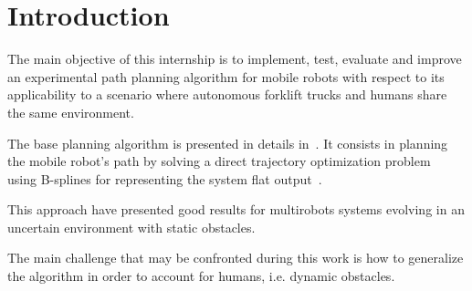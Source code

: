 
\pagestyle{fancy}
\fancyhead{}
\fancyhead[RE,LO]{\leftmark} %
\fancyfoot{}
\fancyfoot[OR,EL]{\thepage}


\section{Introduction}


The main objective of this internship is to implement, test, evaluate and improve an experimental path planning algorithm for mobile robots with respect to its applicability to a scenario where autonomous forklift trucks and humans share the same environment.

The base planning algorithm is presented in details in~\cite{Defoort2007a}.
It consists in planning the mobile robot's path by solving a direct trajectory optimization problem~\cite{betts1998survey} using B-splines for representing the system flat output~\cite{milam2003real}.

This approach have presented good results for multirobots systems evolving in an uncertain environment with static obstacles.

The main challenge that may be confronted during this work is how to generalize the algorithm in order to account for humans, i.e. dynamic obstacles.
